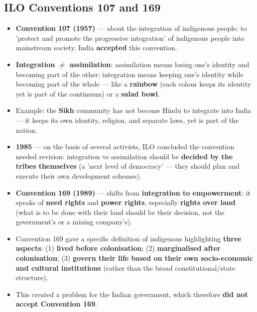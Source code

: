 \subsection{ILO Conventions 107 and 169}

\begin{GovtPolicy}
\begin{itemize}
\item \textbf{Convention 107 (1957)} --- about the integration of indigenous people: to 'protect and promote the progressive integration' of indigenous people into mainstream society. India \textbf{accepted} this convention.
\item \textbf{Integration $\neq$ assimilation}: assimilation means losing one's identity and becoming part of the other; integration means keeping one's identity while becoming part of the whole --- like a \textbf{rainbow} (each colour keeps its identity yet is part of the continuum) or a \textbf{salad bowl}.
\item Example: the \textbf{Sikh} community has not become Hindu to integrate into India --- it keeps its own identity, religion, and separate laws, yet is part of the nation.
\end{itemize}
\end{GovtPolicy}

\begin{GovtPolicy}
\begin{itemize}
\item \textbf{1985} --- on the basis of several activists, ILO concluded the convention needed revision: integration vs assimilation should be \textbf{decided by the tribes themselves} (a 'next level of democracy' --- they should plan and execute their own development schemes).
\item \textbf{Convention 169 (1989)} --- shifts from \textbf{integration to empowerment}: it speaks of \textbf{need rights} and \textbf{power rights}, especially \textbf{rights over land} (what is to be done with their land should be their decision, not the government's or a mining company's).
\item Convention 169 gave a specific definition of indigenous highlighting \textbf{three aspects}: (1) \textbf{lived before colonisation}; (2) \textbf{marginalised after colonisation}; (3) \textbf{govern their life based on their own socio-economic and cultural institutions} (rather than the broad constitutional/state structure).
\item This created a problem for the Indian government, which therefore \textbf{did not accept Convention 169}.
\end{itemize}
\end{GovtPolicy}

